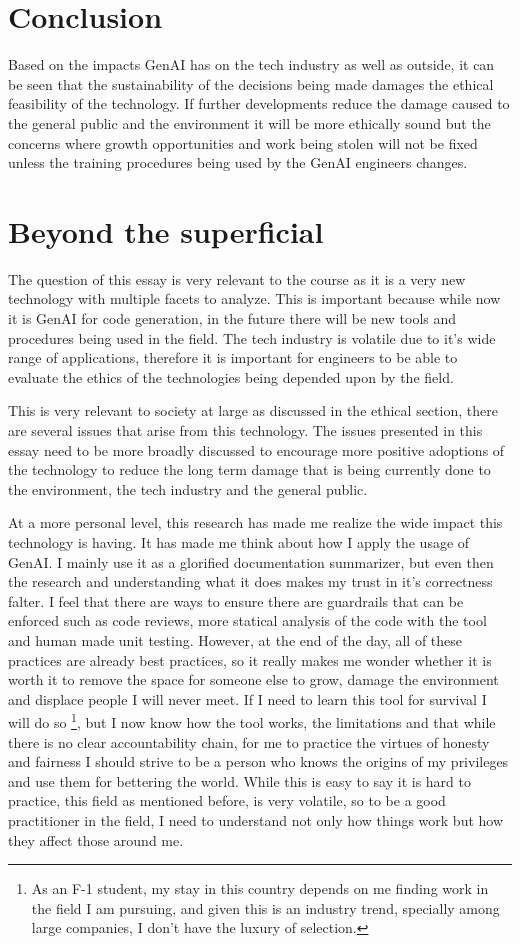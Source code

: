 \section{Conclusion}
Based on the impacts GenAI has on the tech industry as well as outside, it can be seen that the sustainability of the decisions being made damages the ethical feasibility of the technology. If further developments reduce the damage caused to the general public and the environment it will be more ethically sound but the concerns where growth opportunities and work being stolen will not be fixed unless the training procedures being used by the GenAI engineers changes.

\section{Beyond the superficial}
The question of this essay is very relevant to the course as it is a very new technology with multiple facets to analyze. This is important because while now it is GenAI for code generation, in the future there will be new tools and procedures being used in the field. The tech industry is volatile due to it's wide range of applications, therefore it is important for engineers to be able to evaluate the ethics of the technologies being depended upon by the field.

This is very relevant to society at large as discussed in the ethical section, there are several issues that arise from this technology. The issues presented in this essay need to be more broadly discussed to encourage more positive adoptions of the technology to reduce the long term damage that is being currently done to the environment, the tech industry and the general public.

At a more personal level, this research has made me realize the wide impact this technology is having. It has made me think about how I apply the usage of GenAI. I mainly use it as a glorified documentation summarizer, but even then the research and understanding what it does makes my trust in it's correctness falter. I feel that there are ways to ensure there are guardrails that can be enforced such as code reviews, more statical analysis of the code with the tool and human made unit testing. However, at the end of the day, all of these practices are already best practices, so it really makes me wonder whether it is worth it to remove the space for someone else to grow, damage the environment and displace people I will never meet. If I need to learn this tool for survival I will do so \footnote{As an F-1 student, my stay in this country depends on me finding work in the field I am pursuing, and given this is an industry trend, specially among large companies, I don't have the luxury of selection.}, but I now know how the tool works, the limitations and that while there is no clear accountability chain, for me to practice the virtues of honesty and fairness I should strive to be a person who knows the origins of my privileges and use them for bettering the world. While this is easy to say it is hard to practice, this field as mentioned before, is very volatile, so to be a good practitioner in the field, I need to understand not only how things work but how they affect those around me.
